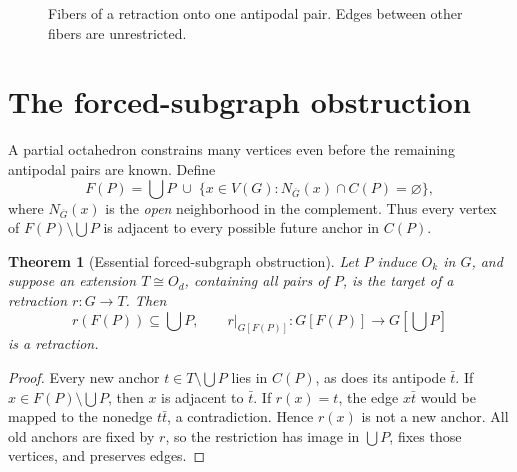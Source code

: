 \documentclass[11pt]{article}
\newtheorem{theorem}{Theorem}[section]
\newcommand{\CC}[1]{C(#1)}
\newcommand{\FF}[1]{F(#1)}
\begin{document}
\begin{figure}[ht]
\centering
{}
\caption{Fibers of a retraction onto one antipodal pair. Edges between other fibers are unrestricted.}
\label{fig:fibers}
\end{figure}

\section{The forced-subgraph obstruction}
A partial octahedron constrains many vertices even before the remaining
antipodal pairs are known. Define
\[
\FF P=\bigcup P\;\cup\;
\bigl\{x\in V(G):N_{\overline G}(x)\cap\CC P=\varnothing\bigr\},
\]
where \(N_{\overline G}(x)\) is the \emph{open} neighborhood in the
complement. Thus every vertex of \(\FF P\setminus\bigcup P\) is
adjacent to every possible future anchor in \(\CC P\).

\begin{theorem}[Essential forced-subgraph obstruction]
\label{thm:forced}
Let \(P\) induce \(O_k\) in \(G\), and suppose an extension
\(T\cong O_d\), containing all pairs of \(P\), is the target of a
retraction \(r:G\to T\). Then
\[
       r(\FF P)\subseteq\bigcup P,
       \qquad r|_{G[\FF P]}:G[\FF P]\longrightarrow G[\bigcup P]
\]
is a retraction.
\end{theorem}
\begin{proof}
Every new anchor \(t\in T\setminus\bigcup P\) lies in \(\CC P\),
as does its antipode \(\bar t\). If \(x\in\FF P\setminus\bigcup P\),
then \(x\) is adjacent to \(\bar t\). If \(r(x)=t\), the edge
\(x\bar t\) would be mapped to the nonedge \(t\bar t\), a
contradiction. Hence \(r(x)\) is not a new anchor. All old
anchors are fixed by \(r\), so the restriction has image in
\(\bigcup P\), fixes those vertices, and preserves edges.
\end{proof}
\end{document}
